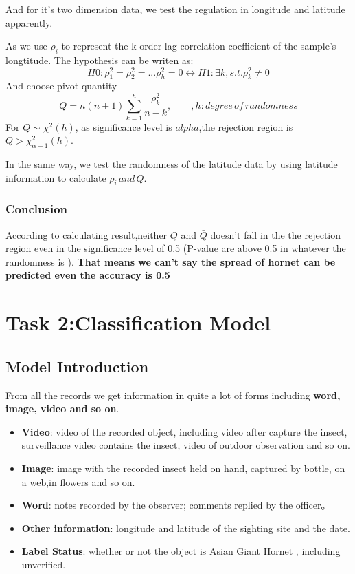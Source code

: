 \documentclass[12pt]{article}
\begin{document}
And for it's two dimension data, we test the regulation in longitude and latitude apparently.

As we use $\rho_i$ to represent the k-order lag correlation coefficient of the sample's longtitude. The  hypothesis can be writen as:
\begin{equation*}
H0:\rho_1^2=\rho_2^2=...\rho_h^2=0 \leftrightarrow H1:\exists k,s.t. \rho_k^2\neq 0
\end{equation*}
And choose pivot quantity
\begin{equation}
Q=n(n+1)\sum_{k=1}^h \frac{\rho_k^2}{n-k},\qquad ,h:degree \,of\, randomness
\end{equation}
For $Q\sim \chi^2(h)$, as significance level is $alpha$,the rejection region is $Q> \chi^2_{\alpha-1}(h)$.

In the same way, we test the randomness of the latitude data by using latitude information to calculate $\bar\rho_i\,and\,\bar{Q}$.

\subsubsection{Conclusion}
According to calculating result,neither $Q$ and $\bar{Q}$ doesn't fall in the  the rejection region even in the significance level of 0.5 (P-value are above 0.5 in whatever the randomness is ). \textbf{That means we can't say the spread of hornet can be predicted even the accuracy is 0.5}

\section{Task 2:Classification Model}
\subsection{Model Introduction}
From all the records we get information in quite a lot of forms including \textbf{word, image, video and so on}.
\begin{itemize}
	\item \textbf{Video}: video of the recorded object, including video after capture the insect, surveillance video contains the insect, video of outdoor observation and so on.
	\item \textbf{Image}: image with the recorded insect held on hand, captured by bottle, on a web,in flowers and so on.
	\item \textbf{Word}: notes recorded by the observer; comments replied by the officer。
	\item \textbf{Other information}: longitude and latitude of the sighting site and the date.
	\item \textbf{Label Status}: whether or not the object is Asian Giant Hornet , including unverified.
\end{itemize}
\end{document}
